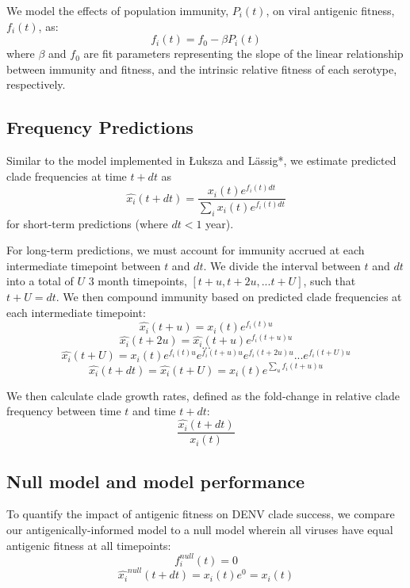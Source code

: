 We model the effects of population immunity, $P_i(t)$, on viral antigenic fitness, $f_i(t)$, as:
\begin{equation}
  \label{eq_fitness}
f_i(t) = f_0-\beta P_i(t)
\end{equation}
where $\beta$ and $f_0$ are fit parameters representing the slope of the linear relationship between immunity and fitness, and the intrinsic relative fitness of each serotype, respectively.

\subsection*{Frequency Predictions}
Similar to the model implemented in {\L}uksza and L\"assig*, we estimate predicted clade frequencies at time $t + dt$ as
\begin{equation}
  \label{eq_predict_frequency}
\hat{x_i}(t+dt) = \frac{x_i(t) e^{f_i(t) dt}}{\sum_{i}x_i(t) e^{f_i(t) dt}}
\end{equation}
for short-term predictions (where $dt < 1$ year).

For long-term predictions, we must account for immunity accrued at each intermediate timepoint between $t$ and $dt$.
We divide the interval between $t$ and $dt$ into a total of $U$ 3 month timepoints, $[t+u, t+2u, ... t+U]$, such that $t+U=dt$.
We then compound immunity based on predicted clade frequencies at each intermediate timepoint:
\begin{equation}
\hat{x_i}(t+u) = x_i(t)e^{f_i(t) u}
\end{equation}
\begin{equation}
\hat{x_i}(t+2u) = \hat{x_i}(t+u) e^{f_i(t+u)u}
\end{equation}
$$...$$
\begin{equation}
\hat{x_i}(t+U) = x_i(t) e^{f_i(t)u} e^{f_i(t+u)u} e^{f_i(t+2u)u} ... e^{f_i(t+U)u}
\end{equation}
\begin{equation}
  \label{eq_compounding_immunity}
\hat{x_i}(t+dt) = \hat{x_i}(t+U) = x_i(t) e^{\sum_{u}f_i(t+u)u}
\end{equation}

We then calculate clade growth rates, defined as the fold-change in relative clade frequency between time $t$ and time $t+dt$:
\begin{equation}
  \label{eq_growth_rate}
\frac{\hat{x_i}(t+dt)}{x_i(t)}
\end{equation}

\subsection*{Null model and model performance}
To quantify the impact of antigenic fitness on DENV clade success, we compare our antigenically-informed model to a null model wherein all viruses have equal antigenic fitness at all timepoints:
\begin{equation}
  \label{eq_null}
f_i^{null}(t) = 0
\end{equation}
\begin{equation}
\hat{x_i}^{null}(t+dt) = x_i(t) e^0 = x_i(t)
\end{equation}

